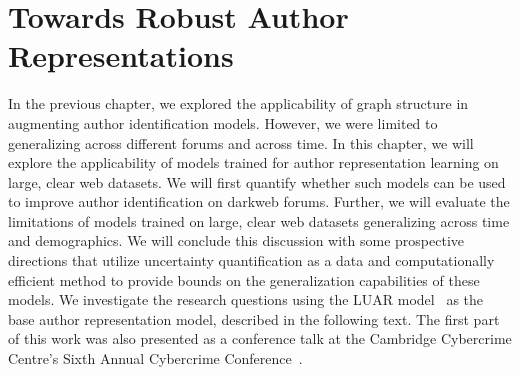\chapter{Towards Robust Author Representations}
\label{chp:stylometry_extensions}

In the previous chapter, we explored the applicability of graph structure in augmenting author identification models. 
However, we were limited to generalizing across different forums and across time.
In this chapter, we will explore the applicability of models trained for author representation learning on large, clear web datasets.
We will first quantify whether such models can be used to improve author identification on darkweb forums.
Further, we will evaluate the limitations of models trained on large, clear web datasets  generalizing across time and demographics.
We will conclude this discussion with some prospective directions that utilize uncertainty quantification as a data and computationally efficient method to provide bounds on the generalization capabilities of these models.
We investigate the research questions using the LUAR model~\citep{riverastao2021learning} as the base author representation model, described in the following text.
The first part of this work was also presented as a conference talk at the Cambridge Cybercrime Centre's Sixth Annual Cybercrime Conference~\citep{maneriker2023following}.






